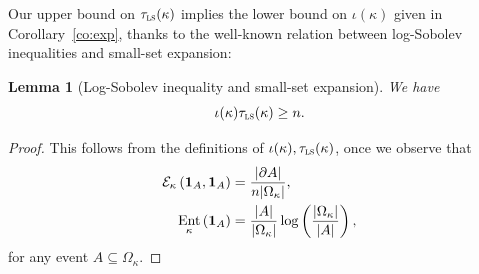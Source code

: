 \documentclass[10pt]{amsart}
\newtheorem{lemm}[theo]{Lemma}\newtheorem{prop}[theo]{Proposition}\newtheorem{coro}[theo]{Corollary}\newtheorem{conj}[theo]{Conjecture}
\theoremstyle{definition}\newtheorem{defi}[theo]{Definition}\newtheorem{rema}[theo]{Remark}\newtheorem{exam}[theo]{Example}\newtheorem{exem}[theo]{Example}\newtheorem{nota}[theo]{Notation}
\newcommand{\cE}{\mathcal{E}}
\newcommand{\tls}{\tau_{\textsc{ls}}}
\newcommand{\bfun}{\bf 1}
\DeclareMathOperator{\ent}{Ent}
\begin{document}
Our upper bound on $\tls(\kappa)$ implies the lower bound on $\iota(\kappa)$ given in Corollary~\ref{co:exp}, thanks to the well-known relation between log-Sobolev inequalities and small-set expansion:
\begin{lemm}[Log-Sobolev inequality and small-set expansion]\label{lm:vs}
We have
\[
\iota(\kappa)\tls(\kappa) \ge n.
\]
\end{lemm}

\begin{proof}
This follows from the definitions of $\iota(\kappa),\tls(\kappa)$, once we observe that
\begin{align*}
\cE_\kappa\left({\bfun}_A,{\bfun}_A\right) & = \frac{|\partial A|}{n|\Omega_\kappa|},\\
\ent_\kappa\left({\bfun}_A\right) & = \frac{|A|}{|\Omega_\kappa|}\log\left(\frac{|\Omega_\kappa|}{|A|}\right),
\end{align*}
for any event $A\subseteq \Omega_\kappa$.
\end{proof}
\end{document}
